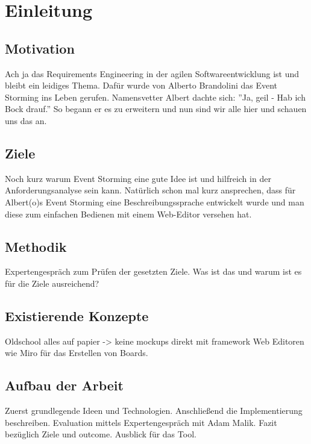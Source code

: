 \chapter{Einleitung}\label{ch:einleitung}

\section{Motivation}\label{sec:motivation}
Ach ja das Requirements Engineering in der agilen Softwareentwicklung ist
und bleibt ein leidiges Thema.
Dafür wurde von Alberto Brandolini das Event Storming ins Leben gerufen.
Namensvetter Albert dachte sich: ''Ja, geil - Hab ich Bock drauf.''
So begann er es zu erweitern und nun sind wir alle hier und schauen uns das an.

\section{Ziele}\label{sec:ziele}
Noch kurz warum Event Storming eine gute Idee ist und hilfreich in der
Anforderungsanalyse sein kann.
Natürlich schon mal kurz ansprechen, dass für Albert(o)s Event Storming eine
Beschreibungssprache entwickelt wurde und man diese zum einfachen Bedienen
mit einem Web-Editor versehen hat.

\section{Methodik}\label{sec:methodik}
Expertengespräch zum Prüfen der gesetzten Ziele.
Was ist das und warum ist es für die Ziele ausreichend?

\section{Existierende Konzepte}\label{sec:existierende-konzepte}
Oldschool alles auf papier -> keine mockups direkt mit framework
Web Editoren wie Miro für das Erstellen von Boards.

\section{Aufbau der Arbeit}\label{sec:aufbau-der-arbeit}
Zuerst grundlegende Ideen und Technologien.
Anschließend die Implementierung beschreiben.
Evaluation mittels Expertengespräch mit Adam Malik.
Fazit bezüglich Ziele und outcome.
Ausblick für das Tool.
